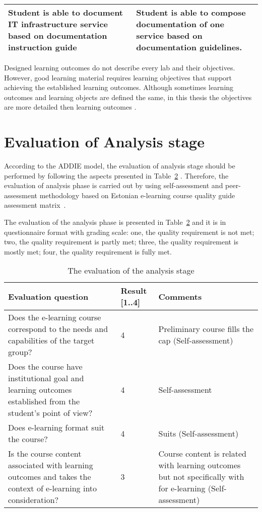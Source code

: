 \begin{table}[h]
{\begin{tabular}{|p{7cm}|p{7cm}|}
\hline 
Student is able to document IT infrastructure service based on documentation instruction guide

& 

Student is able to compose documentation of one service based on documentation guidelines. 
\\ 
\hline 

\end{tabular} 
}
\label{tab:learning_outcomes}
\end{table}

Designed learning outcomes do not describe every lab and their objectives. However, good learning material requires learning objectives that support  achieving the established learning outcomes. Although sometimes learning outcomes and learning objects are defined the same, in this thesis the objectives are more detailed then learning outcomes \citep{website:objective_vs_outcome}.

\section{Evaluation of Analysis stage}

According to the \gls{ADDIE} model, the evaluation of analysis stage should be performed by following the aspects presented in Table~\ref{tab:evoluation_analysis} \citep[p.~11]{OppeArenduskeskus2010}. Therefore, the evaluation of analysis phase is carried out by using self-assessment and peer-assessment methodology based on Estonian e-learning course quality guide assessment matrix~\citep{website:quality_mx}.

The evaluation of the analysis phase is presented in Table~\ref{tab:evoluation_analysis} and it is in questionnaire format with grading scale: one, the quality requirement is not met; two, the quality requirement is partly met; three, the quality requirement is mostly met; four, the quality requirement is fully met.
\begin{table}[h]
\centering
\caption{The evaluation of the analysis stage }
{ \small 
\begin{tabular}{|p{6cm}|p{2cm}|p{5cm}|}
\hline 
\color{blue} Evaluation  question & \color{blue} Result [1..4] & \color{blue} Comments \\ 
\hline
Does the e-learning course correspond to the needs and capabilities of the target group? 
& 4  &  Preliminary course fills the cap (Self-assessment)\\ 
\hline 
Does the course have institutional goal and learning outcomes established from the student’s point of view?
& 4 & Self-assessment  \\ 
\hline 
Does e-learning format suit the course?
& 4 & Suits (Self-assessment) \\ 
\hline
Is the course content associated with learning outcomes and takes the context of e-learning into consideration?
& 3 & Course content is related with learning outcomes but not specifically with for e-learning (Self-assessment) \\ 
\hline 
\end{tabular} 
}
\label{tab:evoluation_analysis}
\end{table}

